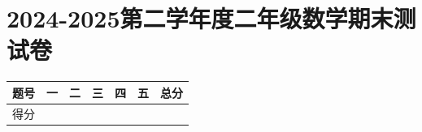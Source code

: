 \documentclass[12pt]{exam-zh}
\begin{document}


\chapter{2024-2025第二学年度二年级数学期末测试卷}




\begin{table}[htbp]
    \centering
    \begin{tabular}{|C|C|C|C|C|C|C|} %
        \hline
        题号 & 一 & 二 & 三 & 四 & 五 & 总分 \\ \hline
        得分 &   &   &   &   &   &   \\ \hline
    \end{tabular}
\end{table}
\end{document}
